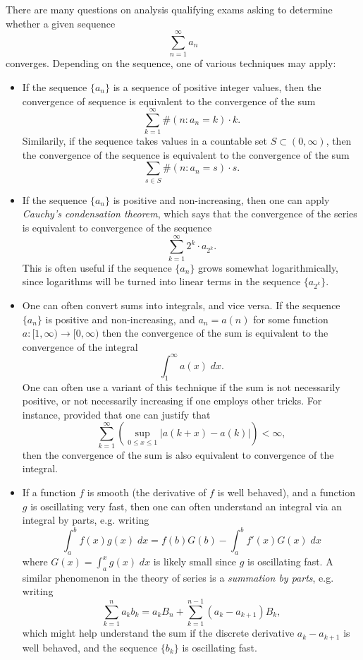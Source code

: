 \documentclass[answers]{exam}
\theoremstyle{problemstyle}
\newcommand{\1}[1]{\textbf{1}_{\left[#1\right]}} %
\begin{document}
There are many questions on analysis qualifying exams asking to determine whether a given sequence
%
\[ \sum_{n = 1}^\infty a_n \]
%
converges. Depending on the sequence, one of various techniques may apply:
%
\begin{itemize}
	\item If the sequence $\{ a_n \}$ is a sequence of positive integer values, then the convergence of sequence is equivalent to the convergence of the sum
	\[ \sum_{k = 1}^\infty \#(n : a_n = k) \cdot k. \]
	Similarily, if the sequence takes values in a countable set $S \subset (0,\infty)$, then the convergence of the sequence is equivalent to the convergence of the sum
	\[ \sum_{s \in S} \#(n : a_n = s) \cdot s. \]

	\item If the sequence $\{ a_n \}$ is positive and non-increasing, then one can apply \emph{Cauchy's condensation theorem}, which says that the convergence of the series is equivalent to convergence of the sequence
	\[ \sum_{k = 1}^\infty 2^k \cdot a_{2^k}. \]
	This is often useful if the sequence $\{ a_n \}$ grows somewhat logarithmically, since logarithms will be turned into linear terms in the sequence $\{ a_{2^k} \}$.

	\item One can often convert sums into integrals, and vice versa. If the sequence $\{ a_n \}$ is positive and non-increasing, and $a_n = a(n)$ for some function $a: [1,\infty) \to [0,\infty)$ then the convergence of the sum is equivalent to the convergence of the integral
	\[ \int_1^\infty a(x)\; dx. \]
	One can often use a variant of this technique if the sum is not necessarily positive, or not necessarily increasing if one employs other tricks. For instance, provided that one can justify that
	\[ \sum_{k = 1}^\infty \left( \sup_{0 \leq x \leq 1} |a(k + x) - a(k)| \right) < \infty, \]
	then the convergence of the sum is also equivalent to convergence of the integral.

	\item If a function $f$ is smooth (the derivative of $f$ is well behaved), and a function $g$ is oscillating very fast, then one can often understand an integral via an integral by parts, e.g. writing
	\[ \int_a^b f(x) g(x)\; dx = f(b) G(b) - \int_a^b f'(x) G(x)\; dx \]
	where $G(x) = \int_a^x g(x)\; dx$ is likely small since $g$ is oscillating fast. A similar phenomenon in the theory of series is a \emph{summation by parts}, e.g. writing
	\[ \sum_{k = 1}^n a_k b_k = a_k B_n + \sum_{k = 1}^{n-1} (a_k - a_{k+1}) B_k, \]
	which might help understand the sum if the discrete derivative $a_k - a_{k+1}$ is well behaved, and the sequence $\{ b_k \}$ is oscillating fast.


\end{itemize}
\end{document}

